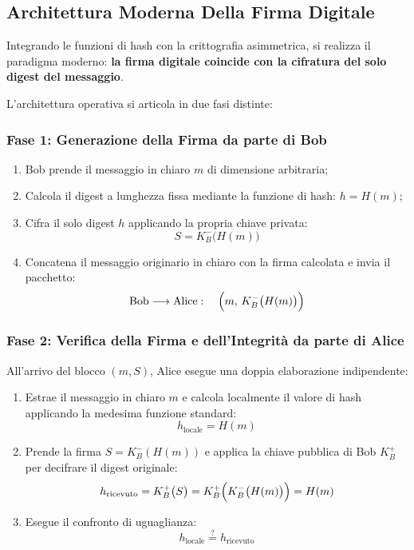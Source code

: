 \documentclass[11pt, a4paper]{article}
\begin{document}
\subsection{Architettura Moderna Della Firma Digitale}

Integrando le funzioni di hash con la crittografia asimmetrica, si realizza il paradigma moderno: \textbf{la firma digitale coincide con la cifratura del solo digest del messaggio}.


L'architettura operativa si articola in due fasi distinte:

\subsubsection{Fase 1: Generazione della Firma da parte di Bob}
\begin{enumerate}[leftmargin=*]
    \item Bob prende il messaggio in chiaro $m$ di dimensione arbitraria;
    \item Calcola il digest a lunghezza fissa mediante la funzione di hash: $h = H(m)$;
    \item Cifra il solo digest $h$ applicando la propria chiave privata:
    \[
    S = K_B^-\bigl(H(m)\bigr)
    \]
    \item Concatena il messaggio originario in chiaro con la firma calcolata e invia il pacchetto:
    \[
    \text{Bob} \longrightarrow \text{Alice}: \quad \Bigl(m, \, K_B^-\bigl(H(m)\bigr)\Bigr)
    \]
\end{enumerate}

\subsubsection{Fase 2: Verifica della Firma e dell'Integrità da parte di Alice}
All'arrivo del blocco $(m, S)$, Alice esegue una doppia elaborazione indipendente:
\begin{enumerate}[leftmargin=*]
    \item Estrae il messaggio in chiaro $m$ e calcola localmente il valore di hash applicando la medesima funzione standard:
    \[
    h_{\text{locale}} = H(m)
    \]
    \item Prende la firma $S = K_B^-(H(m))$ e applica la chiave pubblica di Bob $K_B^+$ per decifrare il digest originale:
    \[
    h_{\text{ricevuto}} = K_B^+\bigl(S\bigr) = K_B^+\Bigl(K_B^-\bigl(H(m)\bigr)\Bigr) = H(m)
    \]
    \item Esegue il confronto di uguaglianza:
    \begin{equation}
    \boxed{h_{\text{locale}} \stackrel{?}{=} h_{\text{ricevuto}}}
    \end{equation}
\end{enumerate}
\end{document}
